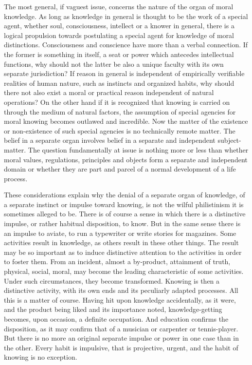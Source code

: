 \documentclass[12pt]{article}
\begin{document}
The most general, if vaguest issue, concerns the nature
of the organ of moral knowledge. As long as
knowledge in general is thought to be the work of a
special agent, whether soul, consciousness, intellect or
a knower in general, there is a logical propulsion towards
postulating a special agent for knowledge of
moral distinctions. Consciousness and conscience have
more than a verbal connection. If the former is something
in itself, a seat or power which antecedes intellectual
functions, why should not the latter be also a
unique faculty with its own separate jurisdiction? If
reason in general is independent of empirically verifiable
realities of human nature, such as instincts and
organized habits, why should there not also exist a
moral or practical reason independent of natural operations?
On the other hand if it is recognized that
knowing is carried on through the medium of natural
factors, the assumption of special agencies for moral
knowing becomes outlawed and incredible. Now the
matter of the existence or non-existence of such special
agencies is no technically remote matter. The belief
in a separate organ involves belief in a separate and
independent subject-matter. The question fundamentally
at issue is nothing more or less than whether
moral values, regulations, principles and objects form
a separate and independent domain or whether they are
part and parcel of a normal development of a life
process.

These considerations explain why the denial of a
separate organ of knowledge, of a separate instinct or
impulse toward knowing, is not the wilful philistinism
it is sometimes alleged to be. There is of course a sense
in which there is a distinctive impulse, or rather habitual
disposition, to know. But in the same sense there
is an impulse to aviate, to run a typewriter or write
stories for magazines. Some activities result in knowledge,
as others result in these other things. The result
may be so important as to induce distinctive attention to
the activities in order to foster them. From an incident,
almost a by-product, attainment of truth, physical, social,
moral, may become the leading characteristic of
some activities. Under such circumstances, they become
transformed. Knowing is then a distinctive activity,
with its own ends and its peculiarly adapted processes.
All this is a matter of course. Having hit
upon knowledge accidentally, as it were, and the product
being liked and its importance noted, knowledge-getting
becomes, upon occasion, a definite occupation.
And education confirms the disposition, as it may confirm
that of a musician or carpenter or tennis-player.
But there is no more an original separate impulse
or power in one case than in the other. Every
habit is impulsive, that is projective, urgent, and the
habit of knowing is no exception.
\end{document}
